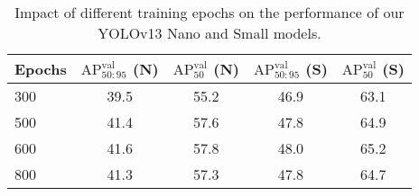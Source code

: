 \begin{table}[!tp]
\centering
\setlength{\tabcolsep}{2.6mm}
\caption{Impact of different training epochs on the performance of our YOLOv13 Nano and Small models.}
\label{tab:epoch}
\renewcommand{\arraystretch}{1.0}
\begin{tabular}{lcccc}
\toprule
\textbf{Epochs} & \textbf{$\text{AP}_{50:95}^\text{val}$ (N)} & \textbf{$\text{AP}_{50}^\text{val}$ (N)} & \textbf{$\text{AP}_{50:95}^\text{val}$ (S)} & \textbf{$\text{AP}_{50}^\text{val}$ (S)} \\
\midrule
300  & 39.5& 55.2& 46.9& 63.1\\
500  & 41.4& 57.6& 47.8& 64.9\\
600  & 41.6& 57.8& 48.0& 65.2\\
800 & 41.3& 57.3& 47.8& 64.7\\
\bottomrule
\end{tabular}
\vspace{-0.4cm}
\end{table}